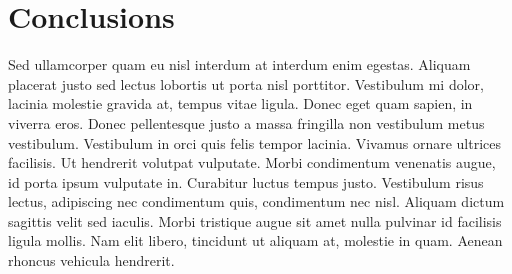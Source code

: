 
\section{Conclusions}

Sed ullamcorper quam eu nisl interdum at interdum enim egestas. Aliquam placerat justo sed lectus lobortis ut porta nisl porttitor. Vestibulum mi dolor, lacinia molestie gravida at, tempus vitae ligula. Donec eget quam sapien, in viverra eros. Donec pellentesque justo a massa fringilla non vestibulum metus vestibulum. Vestibulum in orci quis felis tempor lacinia. Vivamus ornare ultrices facilisis. Ut hendrerit volutpat vulputate. Morbi condimentum venenatis augue, id porta ipsum vulputate in. Curabitur luctus tempus justo. Vestibulum risus lectus, adipiscing nec condimentum quis, condimentum nec nisl. Aliquam dictum sagittis velit sed iaculis. Morbi tristique augue sit amet nulla pulvinar id facilisis ligula mollis. Nam elit libero, tincidunt ut aliquam at, molestie in quam. Aenean rhoncus vehicula hendrerit.